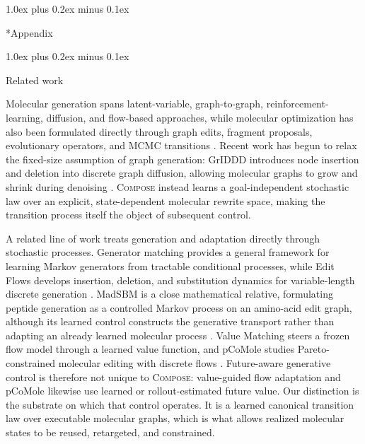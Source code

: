 \documentclass{article}
\makeatletter
\theoremstyle{definition}
\theoremstyle{remark}
\newcommand{\method}{\textsc{Compose}\xspace}
\def\section{\@startsection{section}{1}{\z@}{-1.4ex plus -0.4ex minus -.2ex}%
  {1.0ex plus 0.2ex minus 0.1ex}{\large\sc\raggedright}}
\makeatother
\begin{document}



\newpage
\appendix
\section*{Appendix}

\section{Related work}
\label{app:related}
\label{sec:related}

Molecular generation spans latent-variable, graph-to-graph, reinforcement-learning, diffusion, and flow-based approaches, while molecular optimization has also been formulated directly through graph edits, fragment proposals, evolutionary operators, and MCMC transitions \citep{gomezbombarelli2018chemvae,jin2018jtvae,jin2019vjtnn,zhou2019moldqn,jensen2019graphga,xie2021mars,fu2021mimosa,vignac2023digress,campbell2024multiflow}. Recent work has begun to relax the fixed-size assumption of graph generation: GrIDDD introduces node insertion and deletion into discrete graph diffusion, allowing molecular graphs to grow and shrink during denoising \citep{ninniri2025griddd}. \method{} instead learns a goal-independent stochastic law over an explicit, state-dependent molecular rewrite space, making the transition process itself the object of subsequent control.

A related line of work treats generation and adaptation directly through stochastic processes. Generator matching provides a general framework for learning Markov generators from tractable conditional processes, while Edit Flows develops insertion, deletion, and substitution dynamics for variable-length discrete generation \citep{holderrieth2025generator,havasi2025editflows}. MadSBM is a close mathematical relative, formulating peptide generation as a controlled Markov process on an amino-acid edit graph, although its learned control constructs the generative transport rather than adapting an already learned molecular process \citep{goel2026madsbm}. Value Matching steers a frozen flow model through a learned value function, and pCoMole studies Pareto-constrained molecular editing with discrete flows \citep{jensen2026valuematching,pcomole2026}. Future-aware generative control is therefore not unique to \method{}: value-guided flow adaptation and pCoMole likewise use learned or rollout-estimated future value. Our distinction is the substrate on which that control operates. It is a learned canonical transition law over executable molecular graphs, which is what allows realized molecular states to be reused, retargeted, and constrained.
\end{document}
